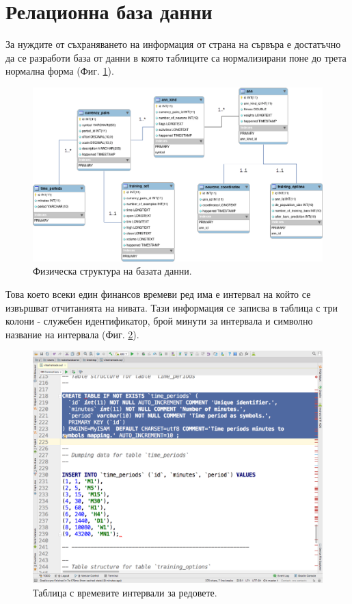 \documentclass[book,14pt,oneside,openany]{memoir}
\begin{document}
\section{Релационна база данни}

За нуждите от съхраняването на информация от страна на сървъра е достатъчно да се разработи база от данни в която таблиците са нормализирани поне до трета нормална форма (Фиг. \ref{fig:pic0096}).

\begin{figure}[h]
  \centering
  \includegraphics[height=0.35\pdfpageheight]{pic0096}
  \caption{Физическа структура на базата данни.}
\label{fig:pic0096}
\end{figure}
\FloatBarrier

Това което всеки един финансов времеви ред има е интервал на който се извършват отчитанията на нивата. Тази информация се записва в таблица с три колони - служебен идентификатор, брой минути за интервала и символно название на интервала (Фиг. \ref{fig:pic0097}).

\begin{figure}[h]
  \centering
  \includegraphics[height=0.45\pdfpageheight]{pic0097}
  \caption{Таблица с времевите интервали за редовете.}
\label{fig:pic0097}
\end{figure}
\FloatBarrier
\end{document}
